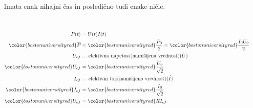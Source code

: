 Imata enak nihajni čas in posledično tudi enake ničle.\\
\\
\begin{align*}
	P(t) &= U(t)I(t)\\
	{\color{bostonuniversityred}\overline{P}} &= {\color{bostonuniversityred}\frac{P_0}{2}} = {\color{bostonuniversityred}\frac{I_0 U_0}{2}}\\
	U_{ef} &\dots \text{efektivna napetost(namišljena vrednost)($\hat{U}$)}\\
	{\color{bostonuniversityred}U_{ef}} &= {\color{bostonuniversityred}\frac{U_0}{\sqrt{2}}}\\
	I_{ef} &\dots \text{efektivni tok(namišljena vrednost)($\hat{I}$)}\\
	{\color{bostonuniversityred}I_{ef}} &= {\color{bostonuniversityred}\frac{I_0}{\sqrt{2}}}\\
	{\color{bostonuniversityred}U_{ef}} &= {\color{bostonuniversityred}RI_{ef}}\\
\end{align*}
